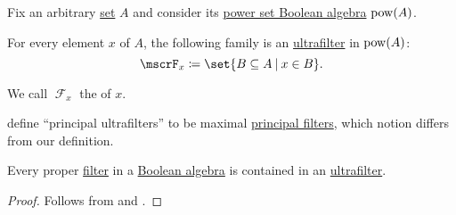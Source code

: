 \begin{definition}\label{def:principal_ultrafilter}
  Fix an arbitrary \hyperref[def:set]{set} \( A \) and consider its \hyperref[thm:boolean_algebra_of_subsets]{power set Boolean algebra} \( \operatorname{pow}(A) \).

  For every element \( x \) of \( A \), the following family is an \hyperref[def:ultrafilter]{ultrafilter} in \( \operatorname{pow}(A) \):
  \begin{equation*}
    \mscrF_x \coloneqq \set{ B \subseteq A \given x \in B }.
  \end{equation*}

  We call \( \mscrF_x \) the  of \( x \).
\end{definition}
\begin{comments}
  \item {} define \enquote{principal ultrafilters} to be maximal \hyperref[def:lattice_ideal/principal]{principal filters}, which notion differs from our definition.
\end{comments}

\begin{lemma}\label{thm:ultrafilter_lemma}
  Every proper \hyperref[def:lattice_ideal]{filter} in a \hyperref[def:boolean_algebra]{Boolean algebra} is contained in an \hyperref[def:ultrafilter]{ultrafilter}.
\end{lemma}
\begin{proof}
  Follows from  and .
\end{proof}
